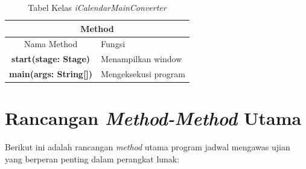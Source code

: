 \begin{table}[H]
	\centering
		\caption{Tabel Kelas \textit{iCalendarMainConverter}}
		\label{tab:iCalendarMainConverter}
		\begin{tabular}{ | c | c | p{4cm} |}
			\hline
				\multicolumn{3}{|c|}{Method}  \\ \hline
				\multicolumn{2}{|c|}{Nama Method} & Fungsi \\ \hline
				\multicolumn{2}{|c|}{\textbf{start(stage: Stage)}} & Menampilkan window\\ \hline
			\multicolumn{2}{|c|}{\textbf{main(args: String[])}} & Mengeksekusi program\\ \hline
		\end{tabular}
\end{table}

\section{Rancangan \textit{Method-Method} Utama}
Berikut ini adalah rancangan \textit{method} utama program jadwal mengawas ujian yang berperan penting dalam perangkat lunak:
